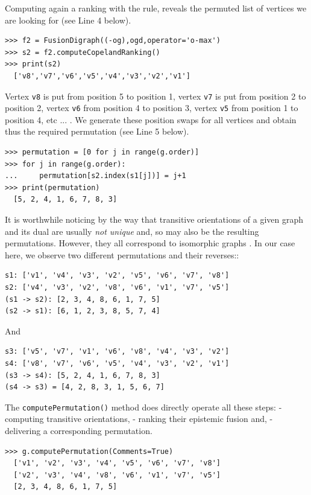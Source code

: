Computing again a ranking with the \Copeland rule, reveals the permuted list of vertices we are looking for (see Line 4 below).
\begin{lstlisting}
>>> f2 = FusionDigraph((-og),ogd,operator='o-max')
>>> s2 = f2.computeCopelandRanking()
>>> print(s2)
  ['v8','v7','v6','v5','v4','v3','v2','v1']
\end{lstlisting}
Vertex \texttt{v8} is put from position 5 to position 1, vertex \texttt{v7} is put from position 2 to position 2, vertex \texttt{v6} from position 4 to position 3, vertex \texttt{v5} from position 1 to position 4, etc ... . We generate these position swaps for all vertices and obtain thus the required permutation (see Line 5 below).
\begin{lstlisting}
>>> permutation = [0 for j in range(g.order)]
>>> for j in range(g.order):
...     permutation[s2.index(s1[j])] = j+1
>>> print(permutation)
  [5, 2, 4, 1, 6, 7, 8, 3]
\end{lstlisting}

It is worthwhile noticing by the way that transitive orientations of a given graph and its dual are usually \emph{not unique} and, so may also be the resulting permutations. However, they all correspond to isomorphic graphs \citep{GOL-2004}. In our case here, we observe two different permutations and their reverses::
\begin{lstlisting}
s1: ['v1', 'v4', 'v3', 'v2', 'v5', 'v6', 'v7', 'v8']
s2: ['v4', 'v3', 'v2', 'v8', 'v6', 'v1', 'v7', 'v5']
(s1 -> s2): [2, 3, 4, 8, 6, 1, 7, 5]
(s2 -> s1): [6, 1, 2, 3, 8, 5, 7, 4]
\end{lstlisting}
And
\begin{lstlisting}  
s3: ['v5', 'v7', 'v1', 'v6', 'v8', 'v4', 'v3', 'v2']
s4: ['v8', 'v7', 'v6', 'v5', 'v4', 'v3', 'v2', 'v1']
(s3 -> s4): [5, 2, 4, 1, 6, 7, 8, 3]
(s4 -> s3) = [4, 2, 8, 3, 1, 5, 6, 7]
\end{lstlisting}
The \texttt{computePermutation()} method does directly operate all these steps: - computing transitive orientations, - ranking their epistemic fusion and, - delivering a corresponding permutation.
\begin{lstlisting}  
>>> g.computePermutation(Comments=True)
  ['v1', 'v2', 'v3', 'v4', 'v5', 'v6', 'v7', 'v8']
  ['v2', 'v3', 'v4', 'v8', 'v6', 'v1', 'v7', 'v5']
  [2, 3, 4, 8, 6, 1, 7, 5]
\end{lstlisting}

